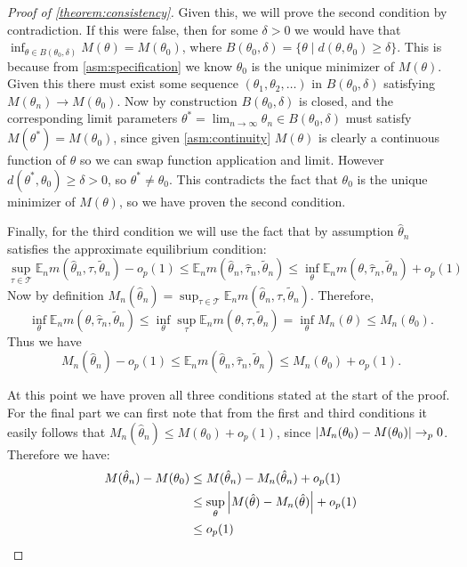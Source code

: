 \documentclass{article}
\theoremstyle{plain}
\theoremstyle{definition}
\newcommand\T{\mathcal T}
\begin{document}
\begin{proof}[Proof of \cref{theorem:consistency}]
Given this, we will prove the second condition by contradiction. If this were false, then for some $\delta > 0$ we would have that $\inf_{\theta \in B(\theta_0,\delta)} M(\theta) = M(\theta_0)$, where $B(\theta_0, \delta) = \{\theta \mid d(\theta,\theta_0) \geq \delta\}$. This is because from \cref{asm:specification} we know $\theta_0$ is the unique minimizer of $M(\theta)$. Given this there must exist some sequence $(\theta_1,\theta_2,\ldots)$ in $B(\theta_0,\delta)$ satisfying $M(\theta_n) \rightarrow M(\theta_0)$. Now by construction $B(\theta_0,\delta)$ is closed, and the corresponding limit parameters $\theta^* = \lim_{n \rightarrow \infty} \theta_n \in B(\theta_0,\delta)$ must satisfy $M(\theta^*) = M(\theta_0)$, since given \cref{asm:continuity} $M(\theta)$ is clearly a continuous function of $\theta$ so we can swap function application and limit. However $d(\theta^*,\theta_0) \geq \delta > 0$, so $\theta^* \neq \theta_0$. This contradicts the fact that $\theta_0$ is the unique minimizer of $M(\theta)$, so we have proven the second condition.

Finally, for the third condition we will use the fact that by assumption $\hat\theta_n$ satisfies the approximate equilibrium condition:
\begin{equation}
    \sup_{\tau \in \T} \mathbb{E}_n m(\hat{\theta}_n, \tau, \tilde\theta_n) - o_p(1) \leq \mathbb{E}_n m(\hat\theta_n, \hat\tau_n, \tilde\theta_n) \leq \inf_\theta \mathbb{E}_n m(\theta, \hat\tau_n, \tilde\theta_n) + o_p(1) \nonumber
\end{equation}
%
Now by definition $M_n(\hat \theta_n) = \sup_{\tau \in \T} \mathbb{E}_n m(\hat{\theta}_n, \tau, \tilde\theta_n)$. Therefore, $$\inf_{\theta} \mathbb{E}_n m(\theta, \hat \tau_n, \tilde\theta_n) \leq \inf_{\theta} \sup_{\tau} \mathbb{E}_n m(\theta, \tau, \tilde\theta_n) =\inf_{\theta} M_n(\theta)\leq M_n(\theta_0).$$
%
Thus we have
\begin{equation}
    M_n(\hat\theta_n) - o_p(1) \leq \mathbb{E}_n m(\hat\theta_n, \hat\tau_n, \tilde\theta_n) \leq M_n(\theta_0) + o_p(1) \nonumber.
\end{equation}
%

At this point we have proven all three conditions stated at the start of the proof. For the final part we can first note that from the first and third conditions it easily follows that $M_n(\hat \theta_n) \leq M(\theta_0) + o_p(1)$, since $\left|M_n(\theta_0) - M(\theta_0)\right| \rightarrow_p 0$. Therefore we have:
\begin{align*}
M(\hat \theta_n) - M(\theta_0) &\leq M(\hat \theta_n) - M_n(\hat \theta_n) + o_p(1) \\
&\leq \sup_{\theta} \left|M(\hat \theta) - M_n(\hat \theta)\right| + o_p(1) \\
&\leq o_p(1) 
\end{align*}


\end{proof}
\end{document}
